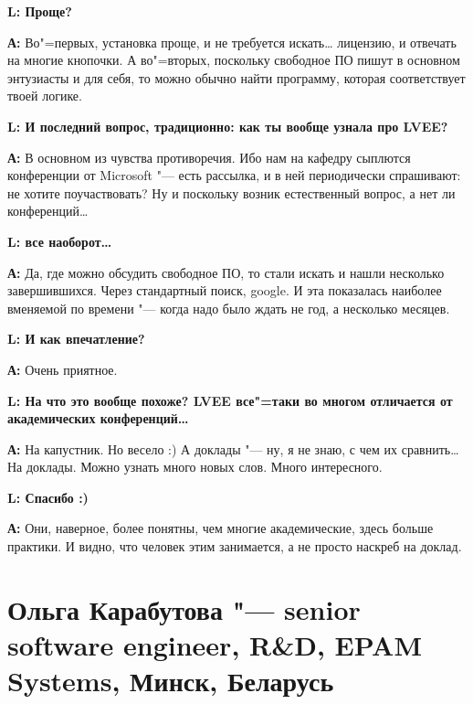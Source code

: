 \documentclass[10pt, a5paper]{article}
\begin{document}
{\noindent \bf L: Проще?}

{\noindent \bf А:} Во"=первых, установка проще, и не требуется искать\ldots{} лицензию, и отвечать на многие кнопочки. А во"=вторых, поскольку свободное ПО пишут в основном энтузиасты и для себя, то можно обычно найти программу, которая соответствует твоей логике.

{\noindent \bf L: И последний вопрос, традиционно: как ты вообще узнала про LVEE?}

{\noindent \bf А:} В основном из чувства противоречия. Ибо нам на кафедру сыплются конференции от Microsoft "--- есть рассылка, и в ней периодически спрашивают: не хотите поучаствовать? Ну и поскольку возник естественный вопрос, а нет ли конференций\ldots

{\noindent \bf L:  все наоборот\ldots}

{\noindent \bf А:} Да, где можно обсудить свободное ПО, то стали искать и нашли несколько завершившихся. Через стандартный поиск, google. И эта показалась наиболее вменяемой по времени "--- когда надо было ждать не год, а несколько месяцев. 

{\noindent \bf L: И как впечатление?}

{\noindent \bf А:} Очень приятное.

{\noindent \bf L: На что это вообще похоже? LVEE все"=таки во многом отличается от академических конференций\ldots}

{\noindent \bf А:} На капустник. Но весело :) А доклады "--- ну, я не знаю, с чем их сравнить\ldots На доклады. Можно узнать много новых слов. Много интересного. 

{\noindent \bf L: Спасибо :)}

{\noindent \bf А:} Они, наверное, более понятны, чем многие академические, здесь больше практики. И видно, что человек этим занимается, а не просто наскреб на доклад. 

\section[Ольга Карабутова "--- senior software engineer, R\&D, EPAM Systems, Минск, Беларусь]{Ольга Карабутова "--- senior software \linebreak engineer, R\&D, EPAM Systems, Минск, Беларусь}

\end{document}
